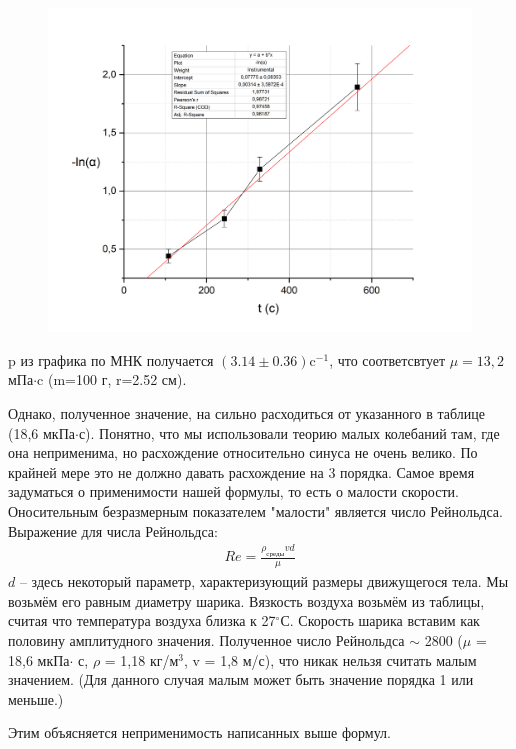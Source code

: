 \documentclass[a4paper, 10pt]{article}%
\begin{document}
\begin{figure}
\center
\includegraphics[scale=0.5]{GR3}
\end{figure}
p из графика по МНК получается $(3.14\pm0.36)\text{c}^{-1}$, что соответсвтует $\mu=13,2$ мПа$\cdot$c (m=100 г, r=2.52 см).

Однако, полученное значение, на сильно расходиться от указанного в таблице (18,6 мкПа$\cdot$с). Понятно, что мы использовали теорию малых колебаний там, где она неприменима, но расхождение относительно синуса не очень велико. По крайней мере это не должно давать расхождение на 3 порядка. Самое время задуматься о применимости нашей формулы, то есть о малости скорости. Оносительным безразмерным показателем "малости" является число Рейнольдса.
Выражение для числа Рейнольдса:
\begin{equation}
\begin{aligned}
Re=\frac{\rho_{\text{среды}} vd}{\mu}
\end{aligned}
\end{equation}
$d$ -- здесь некоторый параметр, характеризующий размеры движущегося тела. Мы возьмём его равным диаметру шарика. Вязкость воздуха возьмём из таблицы, считая что температура воздуха близка к 27$^{\circ}$С. Скорость шарика вставим как половину амплитудного значения. Полученное число Рейнольдса $\sim$ 2800 ($\mu$ = 18,6 мкПа$\cdot$ с, $\rho$ = 1,18 кг/м$^3$, v = 1,8 м/с), что никак нельзя считать малым значением. (Для данного случая малым может быть значение порядка 1 или меньше.)

Этим объясняется неприменимость написанных выше формул. 
\end{document}
